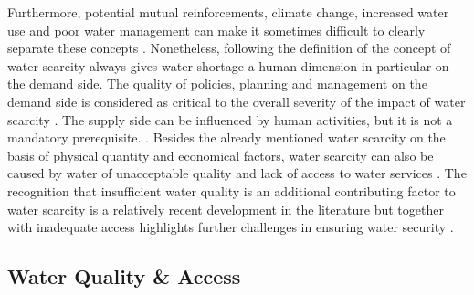 {Furthermore, potential mutual reinforcements, climate change, increased water use and poor water management can make it sometimes difficult to clearly separate these concepts \autocite{idmpDroughtWaterScarcity2022,lealfilhoUnderstandingResponsesClimaterelated2022,liuWaterScarcityAssessments2017,rcrcFORECASTBASEDFINANCINGEARLY2020}. Nonetheless, following the definition of \autocite{faoCopingWaterScarcity2012} the concept of water scarcity always gives water shortage a human dimension in particular on the demand side. The quality of policies, planning and management on the demand side is considered as critical to the overall severity of the impact of water scarcity \autocite{idmpDroughtWaterScarcity2022,faoCopingWaterScarcity2012,vereintenationenSpecialReportDrought2021}. The supply side can be influenced by human activities, but it is not a mandatory prerequisite. \autocite{idmpDroughtWaterScarcity2022}. 
Besides the already mentioned water scarcity on the basis of physical quantity and economical factors, water scarcity can also be caused by water of unacceptable quality and lack of access to water services \autocite{faoCopingWaterScarcity2012}. The recognition that insufficient water quality is an additional contributing factor to water scarcity is a relatively recent development in the literature \autocite{liuThreedimensionalWaterScarcity2020} but together with inadequate access highlights further challenges in ensuring water security \autocite{caretta2022water, mishraWaterSecurityChanging2021}. 



\subsection{Water Quality \& Access}

}
